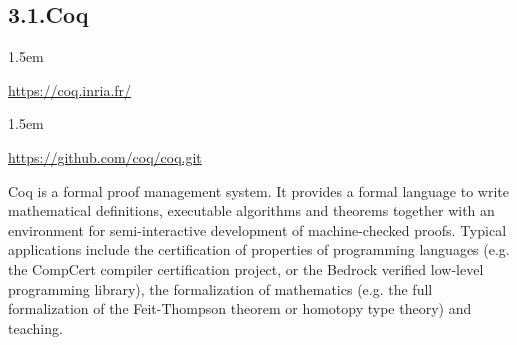 \documentclass[12pt,twoside]{article}
\begin{document}
\subsection{3.1.\hspace*{0.5em}Coq}%

\begin{mddefinitions}%


\begin{mdbmarginx}{}{}{}{1.5em}%
\begin{mddefdata}%
\href{https://coq.inria.fr/}{{\ttfamily https://\hspace{0pt}coq.\hspace{0pt}inria.\hspace{0pt}fr/\hspace{0pt}}}
\end{mddefdata}%
\end{mdbmarginx}%


\begin{mdbmarginx}{}{}{}{1.5em}%
\begin{mddefdata}%
\href{https://github.com/coq/coq.git}{{\ttfamily https://\hspace{0pt}github.\hspace{0pt}com/\hspace{0pt}coq/\hspace{0pt}coq.\hspace{0pt}git}}%
\end{mddefdata}%
\end{mdbmarginx}%
\end{mddefinitions}%

\noindent{}Coq is a formal proof management system. It provides a formal language
to write mathematical definitions, executable algorithms and theorems
together with an environment for semi-interactive development of
machine-checked proofs. Typical applications include the certification
of properties of programming languages (e.g. the CompCert compiler
certification project, or the Bedrock verified low-level programming
library), the formalization of mathematics (e.g. the full
formalization of the Feit-Thompson theorem or homotopy type theory)
and teaching.%
\end{document}
